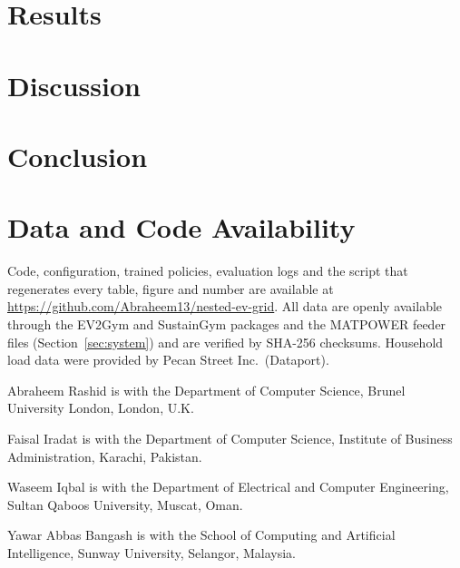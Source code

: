 \documentclass[journal]{IEEEtran}
\begin{document}
\section{Results}
\label{sec:results}



\section{Discussion}
\label{sec:discussion}



\section{Conclusion}
\label{sec:conclusion}



\section*{Data and Code Availability}
Code, configuration, trained policies, evaluation logs and the script that
regenerates every table, figure and number are available at
\url{https://github.com/Abraheem13/nested-ev-grid}. All data are openly
available through the EV2Gym and SustainGym packages and the MATPOWER feeder
files (Section~\ref{sec:system}) and are verified by SHA-256 checksums.
Household load data were provided by Pecan Street Inc.\ (Dataport).



\begin{IEEEbiographynophoto}{Abraheem Rashid}
is with the Department of Computer Science, Brunel University London, London,
U.K.
\end{IEEEbiographynophoto}

\begin{IEEEbiographynophoto}{Faisal Iradat}
is with the Department of Computer Science, Institute of Business
Administration, Karachi, Pakistan.
\end{IEEEbiographynophoto}

\begin{IEEEbiographynophoto}{Waseem Iqbal}
is with the Department of Electrical and Computer Engineering, Sultan Qaboos
University, Muscat, Oman.
\end{IEEEbiographynophoto}

\begin{IEEEbiographynophoto}{Yawar Abbas Bangash}
is with the School of Computing and Artificial Intelligence, Sunway University,
Selangor, Malaysia.
\end{IEEEbiographynophoto}
\end{document}
